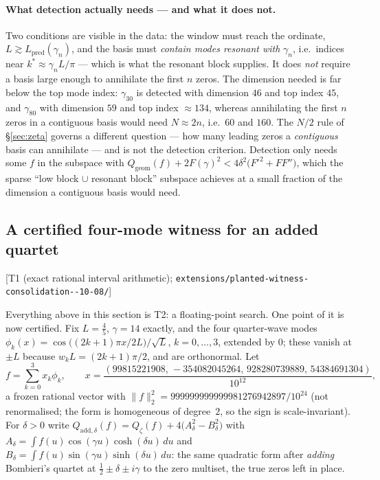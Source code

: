 \documentclass[11pt,a4paper]{article}
\theoremstyle{definition}
\theoremstyle{remark}
\newcommand{\tier}[1]{{\small\textsf{[#1]}}}
\newcommand{\src}[1]{{\footnotesize\texttt{#1}}}
\begin{document}
\paragraph{What detection actually needs --- and what it does not.} Two conditions are
visible in the data: the window must reach the ordinate,
$L\gtrsim L_{\mathrm{pred}}(\gamma_n)$, and the basis must \emph{contain modes resonant with}
$\gamma_n$, i.e.\ indices near $k^{*}\approx\gamma_n L/\pi$ --- which is what the resonant
block supplies. It does \emph{not} require a basis large enough to annihilate the first $n$
zeros. The dimension needed is far below the top mode index: $\gamma_{30}$ is detected with
dimension $46$ and top index $45$, and $\gamma_{80}$ with dimension $59$ and top index
$\approx134$, whereas annihilating the first $n$ zeros in a contiguous basis would need
$N\approx2n$, i.e.\ $60$ and $160$. The $N/2$ rule of \S\ref{sec:zeta} governs a different
question --- how many leading zeros a \emph{contiguous} basis can annihilate --- and is not
the detection criterion. Detection only needs some $f$ in the subspace with
$Q_{\mathrm{geom}}(f)+2F(\gamma)^{2}<4\delta^{2}\bigl(F'^{2}+FF''\bigr)$, which the sparse
``low block $\cup$ resonant block'' subspace achieves at a small fraction of the dimension a
contiguous basis would need.

\subsection{A certified four-mode witness for an added quartet}\label{sec:certwitness}
\tier{T1 (exact rational interval arithmetic); \src{extensions/planted-\allowbreak witness-\allowbreak consolidation-\allowbreak 2026-10-08/}}

Everything above in this section is T2: a floating-point search. One point of it is now
certified. Fix $L=\tfrac45$, $\gamma=14$ exactly, and the four quarter-wave modes
$\phi_k(x)=\cos\bigl((2k+1)\pi x/2L\bigr)/\sqrt L$, $k=0,\dots,3$, extended by $0$; these
vanish at $\pm L$ because $w_kL=(2k+1)\pi/2$, and are orthonormal. Let
\[
  f=\sum_{k=0}^{3}x_k\phi_k,\qquad
  x=\frac{(99815221908,\,-354082045264,\,928280739889,\,54384691304)}{10^{12}},
\]
a frozen rational vector with $\|f\|_2^{2}=999999999999981276942897/10^{24}$ (not
renormalised; the form is homogeneous of degree~$2$, so the sign is scale-invariant). For
$\delta>0$ write $Q_{\mathrm{add},\delta}(f)=Q_\zeta(f)+4\bigl(A_\delta^{2}-B_\delta^{2}\bigr)$
with $A_\delta=\int f(u)\cos(\gamma u)\cosh(\delta u)\,du$ and
$B_\delta=\int f(u)\sin(\gamma u)\sinh(\delta u)\,du$: the same quadratic form after
\emph{adding} Bombieri's quartet at $\tfrac12\pm\delta\pm i\gamma$ to the zero multiset, the
true zeros left in place.
\end{document}
